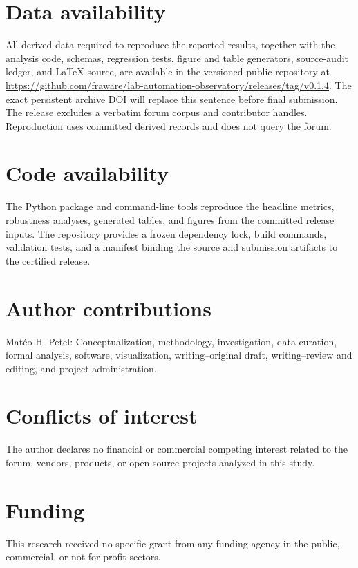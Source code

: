 \section*{Data availability}

All derived data required to reproduce the reported results, together with the analysis code, schemas, regression tests, figure and table generators, source-audit ledger, and LaTeX source, are available in the versioned public repository at \url{https://github.com/fraware/lab-automation-observatory/releases/tag/v0.1.4}. The exact persistent archive DOI will replace this sentence before final submission. The release excludes a verbatim forum corpus and contributor handles. Reproduction uses committed derived records and does not query the forum.

\section*{Code availability}

The Python package and command-line tools reproduce the headline metrics, robustness analyses, generated tables, and figures from the committed release inputs. The repository provides a frozen dependency lock, build commands, validation tests, and a manifest binding the source and submission artifacts to the certified release.

\section*{Author contributions}

Mat\'eo H. Petel: Conceptualization, methodology, investigation, data curation, formal analysis, software, visualization, writing--original draft, writing--review and editing, and project administration.

\section*{Conflicts of interest}

The author declares no financial or commercial competing interest related to the forum, vendors, products, or open-source projects analyzed in this study.

\section*{Funding}

This research received no specific grant from any funding agency in the public, commercial, or not-for-profit sectors.

